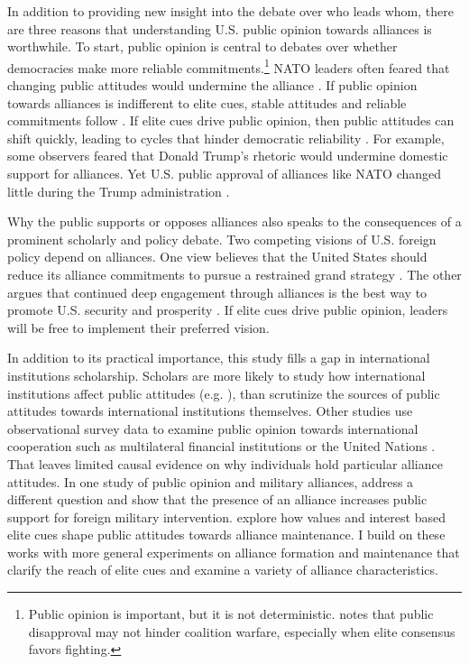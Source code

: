 \documentclass[12pt]{article}
\begin{document}
In addition to providing new insight into the debate over who leads whom, there are three reasons that understanding U.S. public opinion towards alliances is worthwhile. 
To start, public opinion is central to debates over whether democracies make more reliable commitments.\footnote{Public opinion is important, but it is not deterministic. \citet{Kreps2010} notes that public disapproval may not hinder coalition warfare, especially when elite consensus favors fighting.}
NATO leaders often feared that changing public attitudes would undermine the alliance \citep{Sayle2019}.   
If public opinion towards alliances is indifferent to elite cues, stable attitudes and reliable commitments follow \citep{Gaubatz1996}.
If elite cues drive public opinion, then public attitudes can shift quickly, leading to cycles that hinder democratic reliability \citep{GartzkeGleditsch2004}.
For example, some observers feared that Donald Trump's rhetoric would undermine domestic support for alliances.
Yet U.S. public approval of alliances like NATO changed little during the Trump administration \citep{PewNATO2020}. 


Why the public supports or opposes alliances also speaks to the consequences of a prominent scholarly and policy debate. 
Two competing visions of U.S. foreign policy depend on alliances. 
One view believes that the United States should reduce its alliance commitments to pursue a restrained grand strategy \citep{Preble2009, Posen2014}.
The other argues that continued deep engagement through alliances is the best way to promote U.S. security and prosperity \citep{Brooksetal2013, BrandsFeaver2017}. 
If elite cues drive public opinion, leaders will be free to implement their preferred vision. 


In addition to its practical importance, this study fills a gap in international institutions scholarship. 
Scholars are more likely to study how international institutions affect public attitudes (e.g. \citep{KayaWalker2014, Greenhill2020}), than scrutinize the sources of public attitudes towards international institutions themselves. 
Other studies use observational survey data to examine public opinion towards international cooperation such as multilateral financial institutions \citep{Edwards2009} or the United Nations \citep{Torgler2008, DellmuthTallberg2015}. 
That leaves limited causal evidence on why individuals hold particular alliance attitudes.
In one study of public opinion and military alliances, \citet{TomzWeeks2021} address a different question and show that the presence of an alliance increases public support for foreign military intervention. 
\citet{Chuetal2021} explore how values and interest based elite cues shape public attitudes towards alliance maintenance. 
I build on these works with more general experiments on alliance formation and maintenance that clarify the reach of elite cues and examine a variety of alliance characteristics. 
\end{document}
